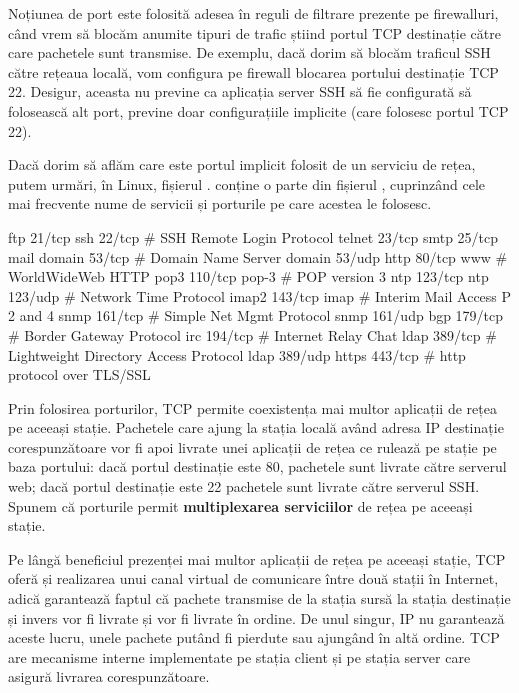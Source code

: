 Noțiunea de port este folosită adesea în reguli de filtrare prezente pe firewalluri, când vrem să blocăm anumite tipuri de trafic știind portul TCP destinație către care pachetele sunt transmise.
De exemplu, dacă dorim să blocăm traficul SSH către rețeaua locală, vom configura pe firewall blocarea portului destinație TCP 22.
Desigur, aceasta nu previne ca aplicația server SSH să fie configurată să folosească alt port, previne doar configurațiile implicite (care folosesc portul TCP 22).

Dacă dorim să aflăm care este portul implicit folosit de un serviciu de rețea, putem urmări, în Linux, fișierul .
 conține o parte din fișierul , cuprinzând cele mai frecvente nume de servicii și porturile pe care acestea le folosesc.

\begin{screen}[caption={Servicii și porturi în Linux (fișierul /etc/services)},label={lst:net:etc-services}]
ftp		21/tcp
ssh		22/tcp				# SSH Remote Login Protocol
telnet		23/tcp
smtp		25/tcp		mail
domain		53/tcp				# Domain Name Server
domain		53/udp
http		80/tcp		www		# WorldWideWeb HTTP
pop3		110/tcp		pop-3		# POP version 3
ntp		123/tcp
ntp		123/udp				# Network Time Protocol
imap2		143/tcp		imap		# Interim Mail Access P 2 and 4
snmp		161/tcp				# Simple Net Mgmt Protocol
snmp		161/udp
bgp		179/tcp				# Border Gateway Protocol
irc		194/tcp				# Internet Relay Chat
ldap		389/tcp			# Lightweight Directory Access Protocol
ldap		389/udp
https		443/tcp				# http protocol over TLS/SSL
\end{screen}

Prin folosirea porturilor, TCP permite coexistența mai multor aplicații de rețea pe aceeași stație.
Pachetele care ajung la stația locală având adresa IP destinație corespunzătoare vor fi apoi livrate unei aplicații de rețea ce rulează pe stație pe baza portului: dacă portul destinație este 80, pachetele sunt livrate către serverul web; dacă portul destinație este 22 pachetele sunt livrate către serverul SSH.
Spunem că porturile permit \textbf{multiplexarea serviciilor} de rețea pe aceeași stație.

Pe lângă beneficiul prezenței mai multor aplicații de rețea pe aceeași stație, TCP oferă și realizarea unui canal virtual de comunicare între două stații în Internet, adică garantează faptul că pachete transmise de la stația sursă la stația destinație și invers vor fi livrate și vor fi livrate în ordine.
De unul singur, IP nu garantează aceste lucru, unele pachete putând fi pierdute sau ajungând în altă ordine.
TCP are mecanisme interne implementate pe stația client și pe stația server care asigură livrarea corespunzătoare.

